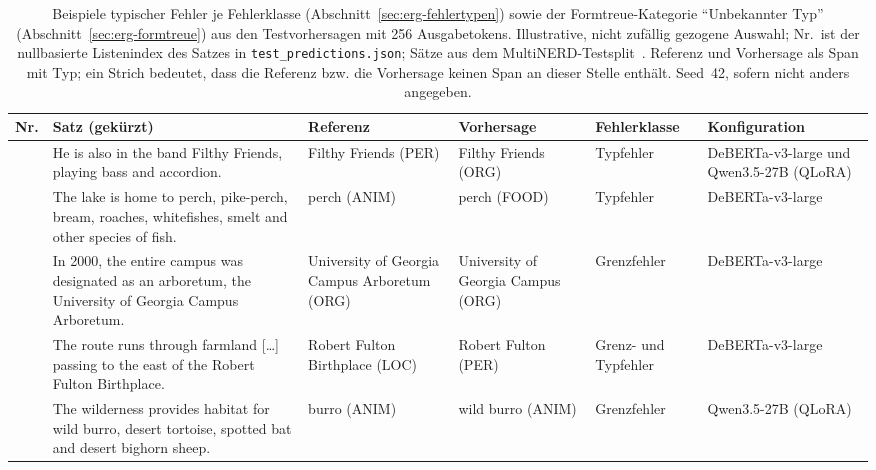 \begin{table}[ht]
  \centering
  \footnotesize
  \caption[Beispiele typischer Fehler je Fehlerklasse]{Beispiele typischer Fehler je Fehlerklasse
  (Abschnitt~\ref{sec:erg-fehlertypen}) sowie der Formtreue-Kategorie
  \enquote{Unbekannter Typ} (Abschnitt~\ref{sec:erg-formtreue}) aus den
  Testvorhersagen mit 256 Ausgabetokens. Illustrative, nicht zufällig
  gezogene Auswahl; Nr.\ ist der nullbasierte Listenindex des Satzes in
  \texttt{test\_predictions.json}; Sätze aus dem MultiNERD-Testsplit~\cite{tedeschi2022multinerd,babelscape2023multinerdcard}. Referenz und Vorhersage als Span mit
  Typ; ein Strich bedeutet, dass die Referenz bzw. die Vorhersage keinen
  Span an dieser Stelle enthält. Seed~42, sofern nicht anders angegeben.}
  \label{tab:app-beispiele}
  \setlength{\tabcolsep}{3pt}
  \begin{tabularx}{\linewidth}{@{}>{\raggedleft\arraybackslash}p{0.85cm}
      >{\raggedright\arraybackslash}X
      >{\raggedright\arraybackslash}p{1.95cm}
      >{\raggedright\arraybackslash}p{1.95cm}
      >{\raggedright\arraybackslash}p{2.15cm}
      >{\raggedright\arraybackslash}p{2.55cm}@{}}
    \toprule
    \textbf{Nr.} & \textbf{Satz (gekürzt)} & \textbf{Referenz} & \textbf{Vorhersage} &
    \textbf{Fehlerklasse} & \textbf{Konfiguration} \\
    \midrule
    327 & He is also in the band Filthy Friends, playing bass and accordion. &
      Filthy Friends (PER) & Filthy Friends (ORG) & Typfehler &
      DeBERTa-v3-large und Qwen3.5-27B (QLoRA) \\
    \addlinespace
    396 & The lake is home to perch, pike-perch, bream, roaches, whitefishes,
      smelt and other species of fish. &
      perch (ANIM) & perch (FOOD) & Typfehler & DeBERTa-v3-large \\
    \addlinespace
    59 & In 2000, the entire campus was designated as an arboretum, the
      University of Georgia Campus Arboretum. &
      University of Georgia Campus Arboretum (ORG) &
      University of Georgia Campus (ORG) & Grenzfehler &
      DeBERTa-v3-large \\
    \addlinespace
    311 & The route runs through farmland [\dots] passing to the east of
      the Robert Fulton Birthplace. &
      Robert Fulton Birthplace (LOC) & Robert Fulton (PER) &
      Grenz- und Typfehler & DeBERTa-v3-large \\
    \addlinespace
    383 & The wilderness provides habitat for wild burro, desert tortoise,
      spotted bat and desert bighorn sheep. &
      burro (ANIM) & wild burro (ANIM) & Grenzfehler & Qwen3.5-27B (QLoRA) \\

\end{tabularx}
\end{table}
